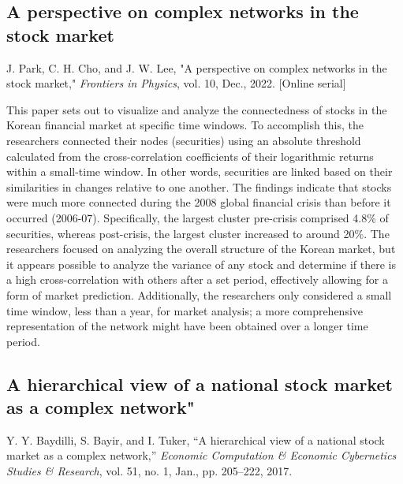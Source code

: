 \documentclass[12pt]{article}
\begin{document}
\subsection{A perspective on complex networks in the stock market}
J. Park, C. H. Cho, and J. W. Lee, "A perspective on complex networks in the stock market," \textit{Frontiers in Physics}, vol. 10, Dec., 2022. [Online serial] %
\newline

This paper sets out to visualize and analyze the connectedness of stocks in the Korean financial market at specific time windows. To accomplish this, the researchers connected their nodes (securities) using an absolute threshold calculated from the cross-correlation coefficients of their logarithmic returns within a small-time window. In other words, securities are linked based on their similarities in changes relative to one another. The findings indicate that stocks were much more connected during the 2008 global financial crisis than before it occurred (2006-07). Specifically, the largest cluster pre-crisis comprised 4.8\% of securities, whereas post-crisis, the largest cluster increased to around 20\%. The researchers focused on analyzing the overall structure of the Korean market, but it appears possible to analyze the variance of any stock and determine if there is a high cross-correlation with others after a set period, effectively allowing for a form of market prediction. Additionally, the researchers only considered a small time window, less than a year, for market analysis; a more comprehensive representation of the network might have been obtained over a longer time period.


\subsection{A hierarchical view of a national stock market as a complex network"}
Y. Y. Baydilli, S. Bayir, and I. Tuker, “A hierarchical view of a national stock market as a complex network,” \textit{Economic Computation \& Economic Cybernetics Studies \& Research}, vol. 51, no. 1, Jan., pp. 205–222, 2017.
\newline
\end{document}

